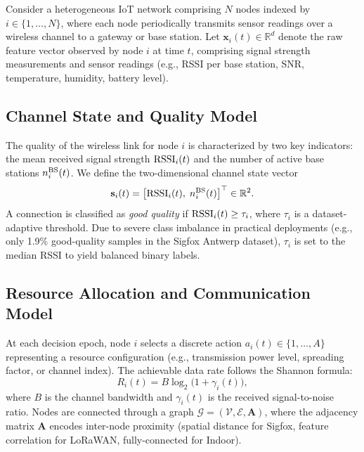 \documentclass[conference]{IEEEtran}
\begin{document}
Consider a heterogeneous IoT network comprising $N$ nodes indexed by
$i\in\{1,\ldots,N\}$, where each node periodically transmits sensor
readings over a wireless channel to a gateway or base station. Let
$\mathbf{x}_i(t)\in\mathbb{R}^d$ denote the raw feature vector
observed by node $i$ at time $t$, comprising signal strength measurements
and sensor readings (e.g., RSSI per base station, SNR, temperature,
humidity, battery level).

\subsection{Channel State and Quality Model}

The quality of the wireless link for node $i$ is characterized by two
key indicators: the mean received signal strength ${\rm RSSI}_i(t)$
and the number of active base stations $n^{\rm BS}_i(t)$. We define
the two-dimensional channel state vector
\begin{equation}
\mathbf{s}_i(t) = \bigl[{\rm RSSI}_i(t),\; n^{\rm BS}_i(t)\bigr]^\top
\in \mathbb{R}^2.
\label{eq:channel_state}
\end{equation}
A connection is classified as \emph{good quality} if
${\rm RSSI}_i(t) \geq \tau_i$, where $\tau_i$ is a dataset-adaptive
threshold. Due to severe class imbalance in practical deployments
(e.g., only 1.9\% good-quality samples in the Sigfox Antwerp dataset),
$\tau_i$ is set to the median RSSI to yield balanced binary labels.

\subsection{Resource Allocation and Communication Model}

At each decision epoch, node $i$ selects a discrete action
$a_i(t)\in\{1,\ldots,A\}$ representing a resource configuration
(e.g., transmission power level, spreading factor, or channel index).
The achievable data rate follows the Shannon formula:
\begin{equation}
R_i(t) = B\log_2\!\bigl(1 + \gamma_i(t)\bigr),
\label{eq:rate}
\end{equation}
where $B$ is the channel bandwidth and $\gamma_i(t)$ is the received
signal-to-noise ratio. Nodes are connected through a graph
$\mathcal{G}=(\mathcal{V},\mathcal{E},\mathbf{A})$, where the adjacency
matrix $\mathbf{A}$ encodes inter-node proximity (spatial distance for
Sigfox, feature correlation for LoRaWAN, fully-connected for Indoor).
\end{document}

